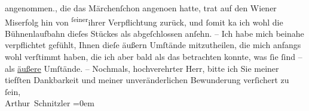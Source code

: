 \begin{ledgroupsized}[t]{13cm}
{{{                  angenommen.}}}\label{K_L00336-3h}, die das Märchenſchon angeno{\geminationm}en hatte,
               trat auf den Wiener Miserfolg hin von \substVorne{}\textsuperscript{ſeiner}{\allowbreak}\substDazwischen{}ihrer\substHinten{} Verpflichtung zurück, und ſomit ka{\geminationn} ich wohl
               die Bühnenlaufbahn dieſes Stückes als abgeſchlossen anſehn. – Ich {\pb}habe mich beinahe verpflichtet gefühlt, Ihnen
               dieſe äußern Umſtände mitzutheilen, die mich anfangs wohl verſtimmt haben, die ich
               aber bald als das betrachten konnte, was ſie ſind – als \uline{äußere} Umſtände. –\pend
           \pstart
           Nochmals, hochverehrter Herr, bitte ich Sie meiner tiefſten Dankbarkeit und
               meiner unveränderlichen Bewunderung verſichert zu ſein,{\\[\baselineskip]}\spacefill\mbox{Arthur Schnitzler}\pend
           \leftskip=0em{}
         
         \endnumbering{}\end{ledgroupsized}  \newcommand{\dateiname}{L00336}\newcommand{\titel}{Arthur Schnitzler an Georg Brandes, 12. 6. 1894}\newcommand{\editorInnen}{Martin Anton Müller und Gerd-Hermann Susen}
      